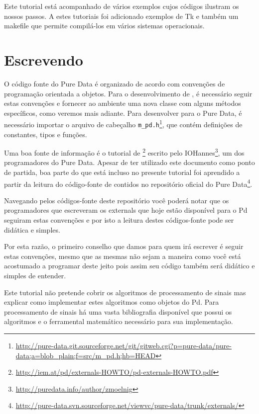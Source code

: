 Este tutorial está acompanhado de vários exemplos cujos códigos ilustram os nossos
passos.
A estes tutoriais foi adicionado exemplos de Tk e também um makefile que
permite compilá-los em vários sistemas operacionais.

\section{Escrevendo \externals}

O código fonte do Pure Data é organizado de acordo com convenções de
programação orientada a objetos.
Para o desenvolvimento de \externals, é necessário seguir estas convenções e
fornecer ao ambiente uma nova classe com alguns métodos específicos, como
veremos mais adiante.
Para desenvolver para o Pure Data, é necessário importar o arquivo de cabeçalho
\texttt{m\_pd.h}\footnote{\url{http://pure-data.git.sourceforge.net/git/gitweb.cgi?p=pure-data/pure-data;a=blob\_plain;f=src/m\_pd.h;hb=HEAD}},
que contém definições de constantes, tipos e funções.

Uma boa fonte de informação é o tutorial de
\externals\footnote{\url{http://iem.at/pd/externals-HOWTO/pd-externals-HOWTO.pdf}}
escrito pelo IOHannes\footnote{\url{http://puredata.info/author/zmoelnig}}, um dos
programadores do Pure Data.
Apesar de ter utilizado este documento como ponto de partida, boa parte do que
está incluso no presente tutorial foi aprendido a partir da leitura do
código-fonte de \externals contidos no repositório oficial do Pure
Data\footnote{\url{http://pure-data.svn.sourceforge.net/viewvc/pure-data/trunk/externals/}}.

Navegando pelos códigos-fonte deste repositório você poderá notar que os programadores
que escreveram os externals que hoje estão disponível para o Pd seguiram estas convenções
e por isto a leitura destes códigos-fonte pode ser didática e simples.

Por esta razão, o primeiro conselho que damos para quem irá escrever \externals é seguir
estas convenções, mesmo que as mesmas não sejam a maneira como você está acostumado a 
programar deste jeito pois assim seu código também será didático e simples de entender.

Este tutorial não pretende cobrir os algoritmos de processamento de sinais mas explicar
como implementar estes algoritmos como objetos do Pd. Para processamento de sinais há
uma vasta bibliografia disponível que possui os algoritmos e o ferramental matemático
necessário para sua implementação.

